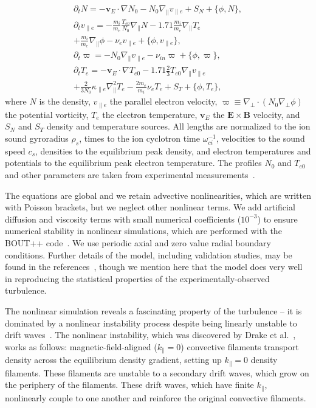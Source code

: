 \documentclass[letter,scriptaddress,twocolumn, prl,showkeys]{revtex4}
\def\beqar{\begin{eqnarray}}
\def\eeqar{\end{eqnarray}}
\def\para{\parallel}
\newcommand{\pdt}{\partial_t}
\def\grad{\nabla}
\newcommand{\gradpar}{\grad_\parallel}
\newcommand{\gradperp}{\grad_\perp}
\newcommand{\vpe}{v_{\parallel e}}
\newcommand{\nue}{\nu_{e}}
\newcommand{\nuin}{\nu_{in}}
\newcommand{\kpe}{\kappa_{\parallel e}}
\newcommand{\fmie}{\frac{m_i}{m_e}}
\begin{document}
\beqar
\label{ni_eq}
\pdt N = - {\mathbf v_E} \cdot \grad N_0 - N_0 \gradpar \vpe + S_N + \{\phi,N\}, \\
\label{ve_eq}
\pdt \vpe = - \fmie \frac{T_{e0}}{N_0} \gradpar N - 1.71 \fmie \gradpar T_e  \nonumber \\
+ \fmie \gradpar \phi - \nue \vpe + \{\phi,\vpe \}, \\
\label{rho_eq}
\pdt \varpi = - N_0 \gradpar \vpe  - \nuin \varpi + \{\phi,\varpi \}, \\
\label{te_eq}
\pdt T_e = - {\mathbf v_E} \cdot \grad T_{e0} - 1.71 \frac{2}{3} T_{e0} \gradpar \vpe \nonumber \\
+ \frac{2}{3 N_0} \kpe \gradpar^2 T_e  - \frac{2 m_e}{m_i} \nue T_e  +  S_T + \{\phi,T_e\},
\eeqar
where $N$ is the density, $\vpe$ the parallel electron velocity, $\varpi \equiv \gradperp \cdot (N_0 \gradperp \phi)$ the potential vorticity,
$T_e$ the electron temperature, ${\mathbf v_E}$ the ${\mathbf E} \times {\mathbf B}$ velocity, and $S_N$ and $S_T$ density and temperature sources. All lengths are
normalized to the ion sound gyroradius $\rho_s$, times to the ion cyclotron time $\omega_{ci}^{-1}$, velocities to the sound speed $c_s$, 
densities to the equilibrium peak density, and electron temperatures and potentials to the equilibrium peak electron temperature. 
The profiles $N_0$ and $T_{e0}$ and other parameters are taken from experimental measurements~\cite{schaffner2012,friedman2012b,friedman2013}. 

The equations are global and we retain advective nonlinearities, which are written with Poisson brackets, but we neglect other nonlinear terms. 
We add artificial diffusion and viscosity terms with small numerical coefficients ($10^{-3}$)
to ensure numerical stability in nonlinear simulations, which are performed with the BOUT++ code~\cite{dudson2009}. We use periodic axial and zero value radial 
boundary conditions. Further details of the model, including validation studies, may be found in the references~\cite{Popovich2010a,Popovich2010b,Umansky2011,friedman2012b,friedman2013},
though we mention here that the model does very well in reproducing the statistical properties of the experimentally-observed turbulence.

The nonlinear simulation reveals a fascinating property of the turbulence -- 
it is dominated by a nonlinear instability process despite being linearly unstable to drift waves~\cite{friedman2012b,friedman2013}.
The nonlinear instability, which was discovered by Drake et al.~\cite{drake1995}, works as follows: 
magnetic-field-aligned ($k_\para=0$) convective filaments transport density across the equilibrium density gradient, setting up $k_\para=0$ density filaments. 
These filaments are unstable to a secondary drift waves, which grow on the periphery of the filaments. 
These drift waves, which have finite $k_\para$, nonlinearly couple to one another and reinforce the original convective filaments.
\end{document}
